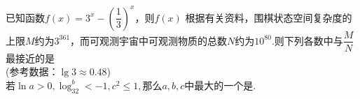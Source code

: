 \documentclass{BHCexam}
\begin{document}
\fubiaoti{}
\maketitle
\begin{questions}
\qs 已知函数$f(x)=3^x-\left(\dfrac{1}{3}\right)^x$，则$f(x)$\xx
{}
\qs 根据有关资料，围棋状态空间复杂度的上限$ M $约为$ 3^{361} $，而可观测宇宙中可观测物质的总数$ N $约为$ 10^{80} $.则下列各数中与$ \dfrac{M}{N} $最接近的是\xx\\
(参考数据：$ \lg 3\approx 0.48 $)\\
\qs 若$ \ln a>0,\log_32^b<-1,c^2\le1, $那么$ a,b,c $中最大的一个是\tk.
\end{questions}
\end{document}
